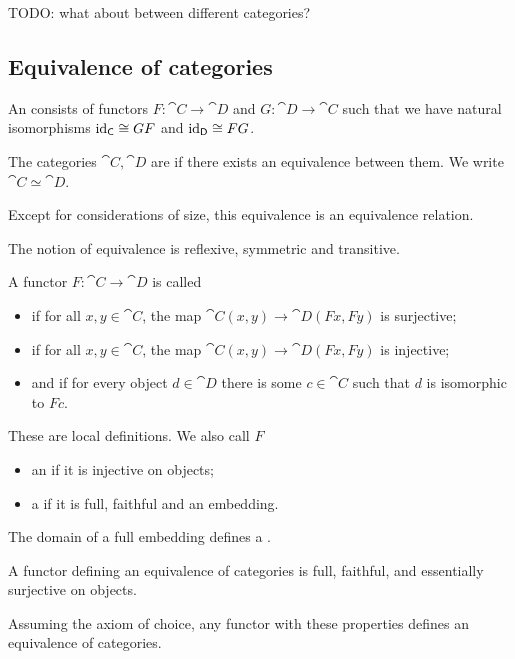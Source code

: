 TODO: what about between different categories?






\subsection{Equivalence of categories}
\begin{definition}
An  consists of functors $F: \cat{C} \to \cat{D}$ and $G: \cat{D} \to \cat{C}$ such that we have natural isomorphisms $\operatorname{id}_{\mathsf{C}} \cong GF$ and $\operatorname{id}_{\mathsf{D}} \cong FG$.

The categories $\cat{C}, \cat{D}$ are  if there exists an equivalence between them. We write $\cat{C} \simeq \cat{D}$.
\end{definition}

Except for considerations of size, this equivalence is an equivalence relation.
\begin{lemma}
The notion of equivalence is reflexive, symmetric and transitive.
\end{lemma}

\begin{definition}
A functor $F:\cat{C}\to\cat{D}$ is called
\begin{itemize}
\item {} if for all $x,y\in \cat{C}$, the map $\cat{C}(x,y) \to \cat{D}(Fx,Fy)$ is surjective;
\item {} if for all $x,y\in \cat{C}$, the map $\cat{C}(x,y) \to \cat{D}(Fx,Fy)$ is injective;
\item and  if for every object $d\in\cat{D}$ there is some $c\in\cat{C}$ such that $d$ is isomorphic to $Fc$.
\end{itemize}
These are local definitions. We also call $F$
\begin{itemize}
\item an  if it is injective on objects;
\item a  if it is full, faithful and an embedding.
\end{itemize}
The domain of a full embedding defines a .
\end{definition}

\begin{proposition}
A functor defining an equivalence of categories is full, faithful, and essentially surjective on objects.

Assuming the axiom of choice, any functor with these properties defines an equivalence of categories.
\end{proposition}

